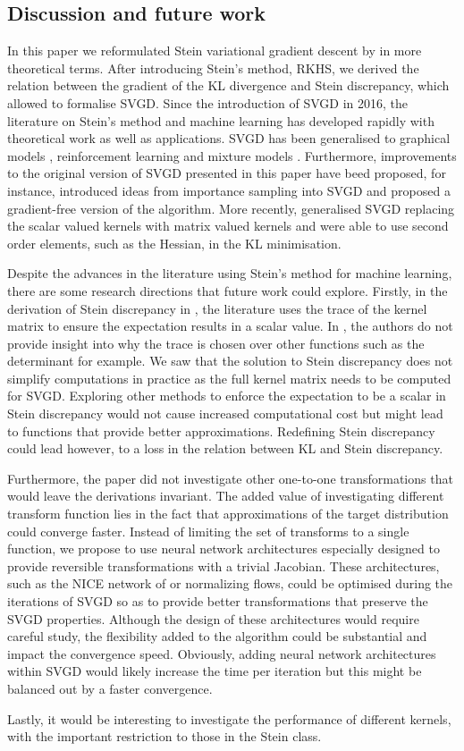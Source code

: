 \subsection{Discussion and future work}
In this paper we reformulated Stein variational gradient descent by \cite{liu2016stein} in more theoretical terms. After introducing Stein's method, RKHS, we derived the relation between the gradient of the KL divergence and Stein discrepancy, which allowed to formalise SVGD. Since the introduction of SVGD in 2016, the literature on Stein's method and machine learning has developed rapidly with theoretical work as well as applications. SVGD has been generalised to graphical models \cite{wang2017stein}, reinforcement learning \cite{liu2017stein2} and mixture models \cite{wang2019nonlinear}. Furthermore, improvements to the original version of SVGD presented in this paper have beed proposed, for instance, \cite{han2017stein} introduced ideas from importance sampling into SVGD and \cite{han2018stein} proposed a gradient-free version of the algorithm. More recently, \cite{wang2019stein} generalised SVGD replacing the scalar valued kernels with matrix valued kernels and were able to use second order elements, such as the Hessian, in the KL minimisation.

Despite the advances in the literature using Stein's method for machine learning, there are some research directions that future work could explore. Firstly, in the derivation of Stein discrepancy in , the literature uses the trace of the kernel matrix to ensure the expectation results in a scalar value. In \cite{liu2016kernelized}, the authors do not provide insight into why the trace is chosen over other functions such as the determinant for example. We saw that the solution to Stein discrepancy does not simplify computations in practice as the full kernel matrix needs to be computed for SVGD. Exploring other methods to enforce the expectation to be a scalar in Stein discrepancy would not cause increased computational cost but might lead to functions that provide better approximations. Redefining Stein discrepancy could lead however, to a loss in the relation between KL and Stein discrepancy.

Furthermore, the paper did not investigate other one-to-one transformations that would leave the derivations invariant. The added value of investigating different transform function lies in the fact that approximations of the target distribution could converge faster. Instead of limiting the set of transforms to a single function, we propose to use neural network architectures especially designed to provide reversible transformations with a trivial Jacobian. These architectures, such as the NICE network of \cite{dinh2014nice} or normalizing flows, could be optimised during the iterations of SVGD so as to provide better transformations that preserve the SVGD properties. Although the design of these architectures would require careful study, the flexibility added to the algorithm could be substantial and impact the convergence speed. Obviously, adding neural network architectures within SVGD would likely increase the time per iteration but this might be balanced out by a faster convergence.

Lastly, it would be interesting to investigate the performance of different kernels, with the important restriction to those in the Stein class.
